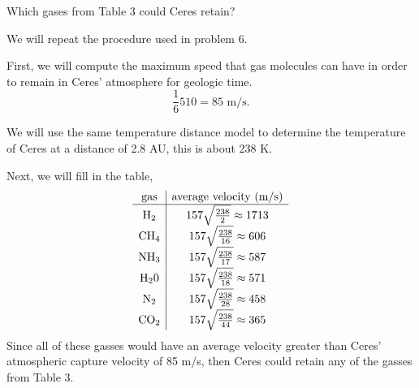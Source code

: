 \documentclass[../astro_4]{subfiles}
\begin{document}
\begin{problem}
Which gases from Table 3 could Ceres retain?
\end{problem}
We will repeat the procedure used in problem 6.

First, we will compute the maximum speed that gas molecules can have in order to remain in Ceres' atmosphere for geologic time.
\[
	\frac{1}{6}510 = 85\text{ m/s}
	.\]

We will use the same temperature distance model to determine the temperature of Ceres at a distance of 2.8 AU, this is about 238 K.

Next, we will fill in the table,
\[
	\begin{array}{c | c}
		\text{gas}         & \text{average velocity (m/s)}        \\
		\hline
		\text{H}_2         & 157\sqrt{\frac{238}{2}} \approx 1713 \\
		\text{CH}_4        & 157\sqrt{\frac{238}{16}} \approx 606 \\
		\text{NH}_3        & 157\sqrt{\frac{238}{17}} \approx 587 \\
		\text{H}_2\text{0} & 157\sqrt{\frac{238}{18}} \approx 571 \\
		\text{N}_2         & 157\sqrt{\frac{238}{28}} \approx 458 \\
		\text{CO}_2        & 157\sqrt{\frac{238}{44}} \approx 365 \\
	\end{array}
\]
Since all of these gasses would have an average velocity greater than Ceres' atmospheric capture velocity of 85 m/s,
then Ceres could retain any of the gasses from Table 3.
\end{document}
